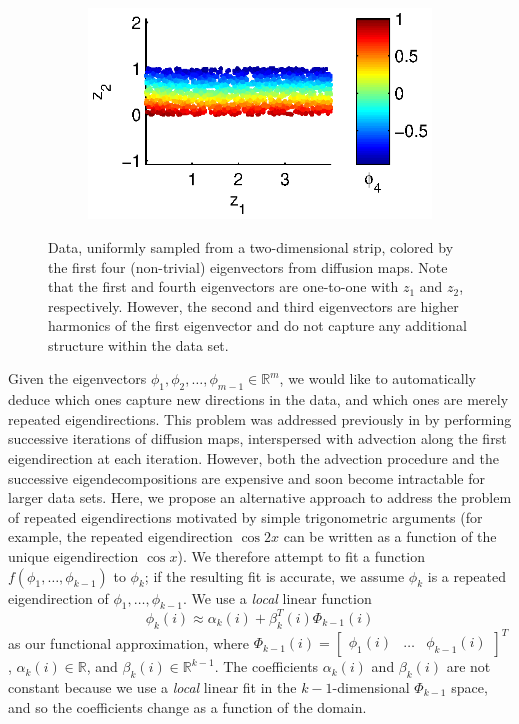 \documentclass[3p]{elsarticle}
\begin{document}
\begin{figure}[t]
\begin{subfigure}{0.24\textwidth}
\end{subfigure}
%
\begin{subfigure}{0.24\textwidth}
\includegraphics[width=\textwidth]{strip_discrete4}
\end{subfigure}
\caption{ Data, uniformly sampled from a two-dimensional strip, colored by the first four (non-trivial) eigenvectors from diffusion maps. Note that the first and fourth eigenvectors are one-to-one with $z_1$ and $z_2$, respectively. However, the second and third eigenvectors are higher harmonics of the first eigenvector and do not capture any additional structure within the data set. }
\label{fig:strip_harmonics}
\end{figure}


Given the eigenvectors $\phi_1, \phi_2, \dots, \phi_{m-1} \in \mathbb{R}^m$, we would like to automatically deduce
which ones capture new directions in the data, and which ones are merely repeated eigendirections.
%
This problem was addressed previously in \cite{gerber2007robust} by performing
successive iterations of diffusion maps, interspersed with advection along the first eigendirection at each iteration.
%
However, both the advection
procedure and the successive eigendecompositions are expensive and soon become intractable for larger data sets.
%
Here, we propose an alternative approach to address the problem of repeated eigendirections
motivated by simple trigonometric arguments (for example, the repeated eigendirection $\cos2x$ 
can be written as a function of the unique eigendirection $\cos x$).
%
We therefore attempt to fit a function $f(\phi_1, \dots, \phi_{k-1})$ to $\phi_{k}$; if the
resulting fit is accurate, we assume $\phi_{k}$ is a repeated eigendirection of $\phi_1, \dots, \phi_{k-1}$.
%
We use a {\em local} linear function
\begin{equation}
\phi_k(i) \approx \alpha_k(i) + \beta_k^T(i) \Phi_{k-1}(i)
\end{equation}
%
as our functional approximation, where
%
$\Phi_{k-1}(i) = \begin{bmatrix} \phi_1(i) & \dots & \phi_{k-1}(i) \end{bmatrix}^T$,
$\alpha_k(i) \in \mathbb{R}$, and $\beta_k(i) \in \mathbb{R}^{k-1}$.
%
The coefficients $\alpha_k(i)$ and $\beta_k(i)$ are not constant because we use a {\em local} linear fit in the $k-1$-dimensional $\Phi_{k-1}$ space, and so the coefficients change as a function of the domain.
\end{document}

